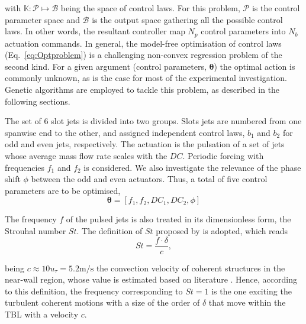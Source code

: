 with $\mathbb{K}: \mathcal{P} \mapsto \mathcal{B}$ being the space of control laws. For this problem, $\mathcal{P}$ is the control parameter space and $\mathcal{B}$ is the output space gathering all the possible control laws. In other words, the resultant controller map $N_p$ control parameters into $N_b$ actuation commands. In general, the model-free optimisation of control laws (Eq.~\eqref{eq:Optproblem}) is a challenging non-convex regression problem of the second kind. For a given argument (control parameters, $\bm{\theta}$) the optimal action is commonly unknown, as is the case for most of the experimental investigation. Genetic algorithms are employed to tackle this problem, as described in the following sections.

The set of 6 slot jets is divided into two groups. Slots jets are numbered from one spanwise end to the other, and assigned independent control laws, $b_1$ and $b_2$ for odd and even jets, respectively. The actuation is the pulsation of a set of jets whose average mass flow rate scales with the $DC$. Periodic forcing with frequencies $f_1$ and $f_2$ is considered. We also investigate the relevance of the phase shift $\phi$ between the odd and even actuators. Thus, a total of five control parameters are to be optimised,
%
\begin{equation}\label{eq:params}
    \bm{\theta} = [f_1,f_2,DC_1,DC_2,\phi]
\end{equation}

The frequency $f$ of the pulsed jets is also treated in its dimensionless form, the Strouhal number $St$. The definition of $St$ proposed by \citet{Castellanos2022slotjet} is adopted, which reads
%
\begin{equation}\label{eq:St}
    St = \frac{f \cdot \delta}{c},
\end{equation}

\noindent being $c \approx 10 u_\tau = 5.2 \mathrm{m/s}$ the convection velocity of coherent structures in the near-wall region, whose value is estimated based on literature \citep{jimenez2004lsturb}. %
Hence, according to this definition, the frequency corresponding to $St = 1$ is the one exciting the turbulent coherent motions with a size of the order of $\delta$ that move within the TBL with a velocity $c$.

